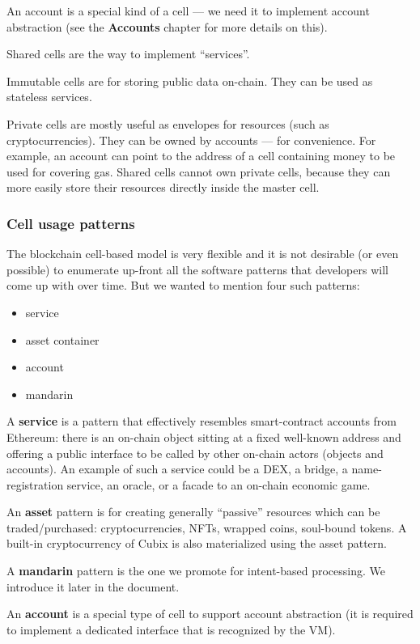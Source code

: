 \documentclass[a4paper]{article}
\begin{document}
An account is a special kind of a cell --- we need it to implement account abstraction (see the \textbf{Accounts} chapter for more details on this).

Shared cells are the way to implement ``services''.

Immutable cells are for storing public data on-chain. They can be used as stateless services.

Private cells are mostly useful as envelopes for resources (such as cryptocurrencies). They can be owned by accounts --- for convenience. For example, an account can point to the address of a cell containing money to be used for covering gas. Shared cells cannot own private cells, because they can more easily store their resources directly inside the master cell.

\subsubsection{Cell usage patterns}

The blockchain cell-based model is very flexible and it is not desirable (or even possible) to enumerate up-front all the software patterns that developers will come up with over time. But we wanted to mention four such patterns:

\begin{itemize}
  \item service
  \item asset container
  \item account
  \item mandarin
\end{itemize}

A \textbf{service} is a pattern that effectively resembles smart-contract accounts from Ethereum: there is an on-chain object sitting at a fixed well-known address and offering a public interface to be called by other on-chain actors (objects and accounts). An example of such a service could be a DEX, a bridge, a name-registration service, an oracle, or a facade to an on-chain economic game.

An \textbf{asset} pattern is for creating generally ``passive'' resources which can be traded/purchased: cryptocurrencies, NFTs, wrapped coins, soul-bound tokens. A built-in cryptocurrency of Cubix is also materialized using the asset pattern.

A \textbf{mandarin} pattern is the one we promote for intent-based processing. We introduce it later in the document.

An \textbf{account} is a special type of cell to support account abstraction (it is required to implement a dedicated interface that is recognized by the VM).
\end{document}
